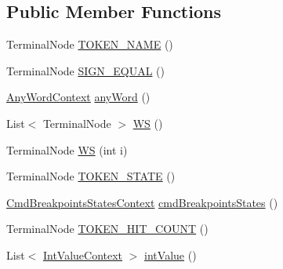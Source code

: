 \subsection*{Public Member Functions}
\begin{DoxyCompactItemize}
\item 
Terminal\+Node \hyperlink{classgov_1_1nasa_1_1jpf_1_1inspector_1_1client_1_1parser_1_1_console_grammar_parser_1_1_cmd_create_b_p_context_a66b882c20b401c5f19543553ed76014d}{T\+O\+K\+E\+N\+\_\+\+N\+A\+ME} ()
\item 
Terminal\+Node \hyperlink{classgov_1_1nasa_1_1jpf_1_1inspector_1_1client_1_1parser_1_1_console_grammar_parser_1_1_cmd_create_b_p_context_aaea9a5e528276faf62b3627d1721e592}{S\+I\+G\+N\+\_\+\+E\+Q\+U\+AL} ()
\item 
\hyperlink{classgov_1_1nasa_1_1jpf_1_1inspector_1_1client_1_1parser_1_1_console_grammar_parser_1_1_any_word_context}{Any\+Word\+Context} \hyperlink{classgov_1_1nasa_1_1jpf_1_1inspector_1_1client_1_1parser_1_1_console_grammar_parser_1_1_cmd_create_b_p_context_ad3ebb542aee4c9e353fa304af39a8abf}{any\+Word} ()
\item 
List$<$ Terminal\+Node $>$ \hyperlink{classgov_1_1nasa_1_1jpf_1_1inspector_1_1client_1_1parser_1_1_console_grammar_parser_1_1_cmd_create_b_p_context_ac7e6a24b002f461359ae5ddcbef4bae3}{WS} ()
\item 
Terminal\+Node \hyperlink{classgov_1_1nasa_1_1jpf_1_1inspector_1_1client_1_1parser_1_1_console_grammar_parser_1_1_cmd_create_b_p_context_ad09f482687ca65537e2448f576576be4}{WS} (int i)
\item 
Terminal\+Node \hyperlink{classgov_1_1nasa_1_1jpf_1_1inspector_1_1client_1_1parser_1_1_console_grammar_parser_1_1_cmd_create_b_p_context_aa7cf7f43b1214f07d5f5e7ff5ea168dd}{T\+O\+K\+E\+N\+\_\+\+S\+T\+A\+TE} ()
\item 
\hyperlink{classgov_1_1nasa_1_1jpf_1_1inspector_1_1client_1_1parser_1_1_console_grammar_parser_1_1_cmd_breakpoints_states_context}{Cmd\+Breakpoints\+States\+Context} \hyperlink{classgov_1_1nasa_1_1jpf_1_1inspector_1_1client_1_1parser_1_1_console_grammar_parser_1_1_cmd_create_b_p_context_aecf7f4274397aa032e3410515a3b9f2f}{cmd\+Breakpoints\+States} ()
\item 
Terminal\+Node \hyperlink{classgov_1_1nasa_1_1jpf_1_1inspector_1_1client_1_1parser_1_1_console_grammar_parser_1_1_cmd_create_b_p_context_a81c505f37dc17c4d0f8a123fa25269ed}{T\+O\+K\+E\+N\+\_\+\+H\+I\+T\+\_\+\+C\+O\+U\+NT} ()
\item 
List$<$ \hyperlink{classgov_1_1nasa_1_1jpf_1_1inspector_1_1client_1_1parser_1_1_console_grammar_parser_1_1_int_value_context}{Int\+Value\+Context} $>$ \hyperlink{classgov_1_1nasa_1_1jpf_1_1inspector_1_1client_1_1parser_1_1_console_grammar_parser_1_1_cmd_create_b_p_context_a10be6400832b1edce8f8453f69c0ec2e}{int\+Value} ()

\end{DoxyCompactItemize}
